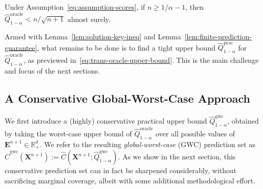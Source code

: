 \begin{lemma}
Under Assumption~\ref{eq:assumption-scores}, if $n \geq 1/\alpha -1 $, then $\hat{Q}^{\mathrm{oracle}}_{1-\alpha} < n/\sqrt{n+1}$ almost surely. %
    \label{lem:finite-prediction-guarantee}
\end{lemma}

Armed with Lemma~\ref{lem:solution-key-ineq} and Lemma~\ref{lem:finite-prediction-guarantee}, what remains to be done is to find a tight upper bound $\hat{Q}^\mathrm{prac}_{1-\alpha}$ for $\hat{Q}^{\mathrm{oracle}}_{1-\alpha}$, as previewed in~\eqref{eq:trans-oracle-upper-bound}. This is the main challenge and focus of the next sections.


\subsection{A Conservative Global-Worst-Case Approach}
\label{sec:method-gwc}

{
\color{blue}
We first introduce a (highly) conservative practical upper bound $\hat{Q}^\mathrm{gwc}_{1-\alpha}$, obtained by taking the worst-case upper bound of $\hat{Q}^{\mathrm{oracle}}_{1-\alpha}$ over all possible values of $\mathbf{E}^{n+1} \in \mathbb{R}^d_+$.
We refer to the resulting {\em global-worst-case} (GWC) prediction set as $\hat{C}^{\mathrm{gwc}}(\mathbf{X}^{n+1}):= \hat{C}(\mathbf{X}^{n+1}; \hat{Q}^\mathrm{gwc}_{1-\alpha})$.
As we show in the next section, this conservative prediction set can in fact be sharpened considerably, without sacrificing marginal coverage, albeit with some additional methodological effort.
}


